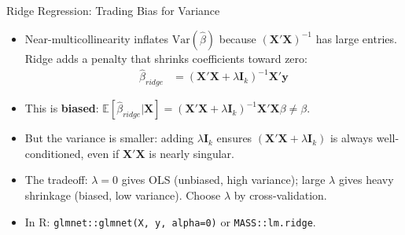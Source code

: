 \documentclass[aspectratio=169, handout, t]{beamer}
\numberwithin{equation}{section}
\begin{document}
 \begin{frame}{Ridge Regression: Trading Bias for Variance}
\begin{itemize}
\item Near-multicollinearity inflates $\text{Var}(\hat{\beta})$ because $(\bm{X'X})^{-1}$ has large entries. Ridge adds a penalty that shrinks coefficients toward zero:\pause
\begin{align*}
\hat{\beta}_{ridge}&=(\bm{X}'\bm{X}+\lambda\bm{I}_k)^{-1}\bm{X}'\bm{y}
\end{align*}\pause
\item This is \textbf{biased}: $\mathbb{E}[\hat{\beta}_{ridge}|\bm{X}]=(\bm{X}'\bm{X}+\lambda\bm{I}_k)^{-1}\bm{X}'\bm{X}\beta \neq \beta$.\pause
\item But the variance is smaller: adding $\lambda\bm{I}_k$ ensures $(\bm{X'X}+\lambda\bm{I}_k)$ is always well-conditioned, even if $\bm{X'X}$ is nearly singular.\pause
\item The tradeoff: $\lambda=0$ gives OLS (unbiased, high variance); large $\lambda$ gives heavy shrinkage (biased, low variance). Choose $\lambda$ by cross-validation.
\item In R: \texttt{glmnet::glmnet(X, y, alpha=0)} or \texttt{MASS::lm.ridge}.
\end{itemize}
 \end{frame}
 
\end{document}
